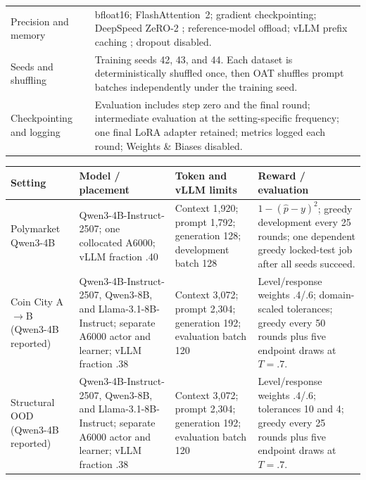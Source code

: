\begin{center}
\begin{minipage}{\linewidth}
\begin{tabular}{p{.29\linewidth}p{.66\linewidth}}
Precision and memory & bfloat16; FlashAttention~2; gradient checkpointing;
DeepSpeed ZeRO-2 \citep{rajbhandari2020zero}; reference-model offload; vLLM prefix
caching \citep{kwon2023vllm}; dropout disabled. \\
Seeds and shuffling & Training seeds 42, 43, and 44.  Each dataset is deterministically
shuffled once, then OAT shuffles prompt batches independently under the training seed. \\
Checkpointing and logging & Evaluation includes step zero and the final round;
intermediate evaluation at the setting-specific frequency; one final LoRA adapter retained; metrics
logged each round; Weights \& Biases disabled. \\
\bottomrule
\end{tabular}
\end{minipage}
\end{center}

\begin{center}
\begin{minipage}{\linewidth}
\centering
{}
\label{tab:exp3-setting-specific}
\scriptsize
\setlength{\tabcolsep}{2pt}
\begin{tabular}{p{.18\linewidth}p{.25\linewidth}p{.23\linewidth}p{.28\linewidth}}
\toprule
\textbf{Setting} & \textbf{Model / placement} & \textbf{Token and vLLM limits} &
\textbf{Reward / evaluation} \\
\midrule
Polymarket Qwen3-4B & Qwen3-4B-Instruct-2507; one collocated A6000; vLLM fraction
.40 & Context 1,920; prompt 1,792; generation 128; development batch 128 &
$1-(\hat p-y)^2$; greedy development every 25 rounds; one dependent greedy locked-test
job after all seeds succeed. \\
Coin City A$\to$B (Qwen3-4B reported) & Qwen3-4B-Instruct-2507, Qwen3-8B, and
Llama-3.1-8B-Instruct; separate A6000 actor and learner; vLLM fraction .38 &
Context 3,072; prompt 2,304; generation 192; evaluation batch 120 &
Level/response weights .4/.6; domain-scaled tolerances; greedy every 50 rounds
plus five endpoint draws at $T=.7$. \\
Structural OOD (Qwen3-4B reported) & Qwen3-4B-Instruct-2507, Qwen3-8B, and
Llama-3.1-8B-Instruct; separate A6000 actor and learner; vLLM fraction .38 & Context
3,072; prompt 2,304; generation 192; evaluation batch 120 & Level/response weights
.4/.6; tolerances 10 and 4; greedy every 25 rounds plus five endpoint draws at
$T=.7$. \\
\bottomrule
\end{tabular}
\end{minipage}
\end{center}

